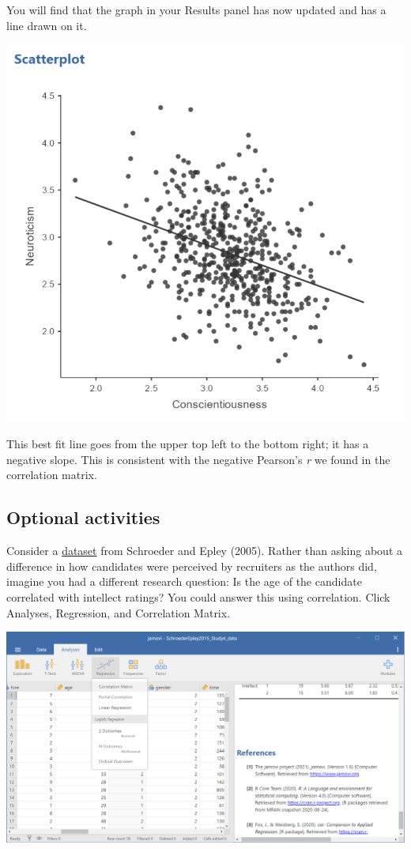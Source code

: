 \documentclass[
]{book}
\begin{document}
You will find that the graph in your Results panel has now updated and has a line drawn on it.

\includegraphics{img/Scatterplot2_Output_WithLine.png}

This best fit line goes from the upper top left to the bottom right; it has a negative slope. This is consistent with the negative Pearson's \emph{r} we found in the correlation matrix.

\hypertarget{optional-activities-2}{%
\subsection{Optional activities}\label{optional-activities-2}}

Consider a \href{https://moodle.stfx.ca/mod/resource/view.php?id=930603}{dataset} from Schroeder and Epley (2005). Rather than asking about a difference in how candidates were perceived by recruiters as the authors did, imagine you had a different research question: Is the age of the candidate correlated with intellect ratings? You could answer this using correlation. Click {Analyses}, {Regression}, and {Correlation Matrix}.

\includegraphics{img/7.4.61.png}
\end{document}
